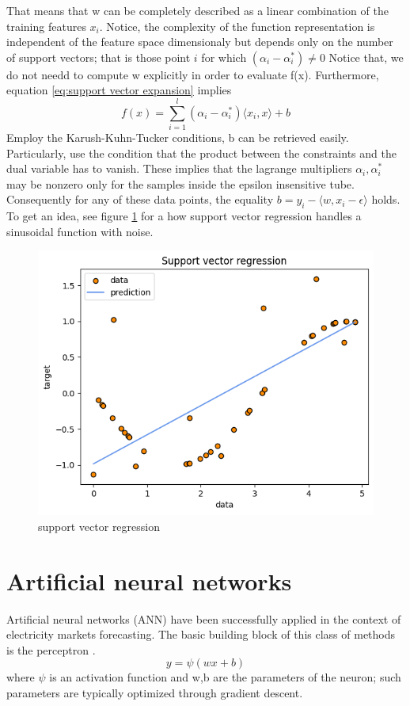 That means that w can be completely described as a linear combination of the training features $x_i$.
Notice, the complexity of the function representation is independent of the feature space dimensionaly but depends only on the number of support vectors; that is those point $i$ for which $(\alpha_i-\alpha_i^*)\neq 0$
Notice that, we do not needd to compute w explicitly in order to evaluate f(x).
Furthermore, equation \ref{eq:support vector expansion} implies
\begin{equation}
    f(x)=\sum\limits_{i=1}^l(\alpha_i-\alpha_i^*)\langle x_i, x\rangle +b
\end{equation}
Employ the Karush-Kuhn-Tucker conditions, b can be retrieved easily. Particularly, use the condition that the product between the constraints and the dual variable has to vanish. These implies that the lagrange multipliers $\alpha_i, \alpha_i^*$ may be nonzero only for the samples inside the epsilon insensitive tube. Consequently for any of these data points, the equality $b=y_i-\langle w, x_i-\epsilon\rangle$ holds.
To get an idea, see figure \ref{fig:svr1} for a how support vector regression handles a sinusoidal function with noise.
\\
\begin{figure}
    \includegraphics[width=\textwidth]{images/svr1.png}
    \caption{support vector regression}
    \label{fig:svr1}
\end{figure}

\section{Artificial neural networks}
Artificial neural networks (ANN) have been successfully applied in the context of electricity markets forecasting. The basic building block of this class of methods is the perceptron \cite{rosenblatt1958perceptron}.
\begin{equation}
    y=\psi(wx+b)
\end{equation}
where $\psi$ is an activation function and w,b are the parameters of the neuron; such parameters are typically optimized through gradient descent.

